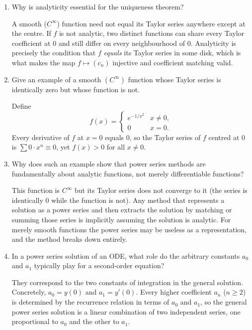 \documentclass{self-check}
\begin{document}
\begin{enumerate}[leftmargin=*, itemsep=8pt]
  \item Why is analyticity essential for the uniqueness theorem?
    \begin{answer}
      A smooth ($C^\infty$) function need not equal its Taylor series
      anywhere except at the centre. If $f$ is not analytic, two
      distinct functions can share every Taylor coefficient at $0$
      and still differ on every neighbourhood of $0$. Analyticity is
      precisely the condition that $f$ \emph{equals} its Taylor
      series in some disk, which is what makes the map $f \mapsto
      (c_n)$ injective and coefficient matching valid.
    \end{answer}

  \item Give an example of a smooth \((C^\infty)\) function whose
    Taylor series is identically zero but whose function is not.
    \begin{answer}
      Define
      \[
        f(x) =
        \begin{cases}
          e^{-1/x^2} & x \neq 0, \\
          0          & x = 0.
        \end{cases}
      \]
      Every derivative of $f$ at $x = 0$ equals $0$, so the Taylor
      series of $f$ centred at $0$ is $\sum 0 \cdot x^n \equiv 0$,
      yet $f(x) > 0$ for all $x \neq 0$.
    \end{answer}

  \item Why does such an example show that power series methods are
    fundamentally about analytic functions, not merely differentiable functions?
    \begin{answer}
      This function is $C^\infty$ but its Taylor series does not
      converge to it (the series is identically $0$ while the
      function is not). Any method that represents a solution as a
      power series and then extracts the solution by matching or
      summing those series is implicitly assuming the solution is
      analytic. For merely smooth functions the power series may be
      useless as a representation, and the method breaks down entirely.
    \end{answer}

  \item In a power series solution of an ODE, what role do the
    arbitrary constants \(a_0\) and \(a_1\) typically play for a
    second-order equation?
    \begin{answer}
      They correspond to the two constants of integration in the
      general solution. Concretely, $a_0 = y(0)$ and $a_1 = y'(0)$.
      Every higher coefficient $a_n$ ($n \ge 2$) is determined by the
      recurrence relation in terms of $a_0$ and $a_1$, so the general
      power series solution is a linear combination of two
      independent series, one proportional to $a_0$ and the other to $a_1$.
    \end{answer}


\end{enumerate}
\end{document}
